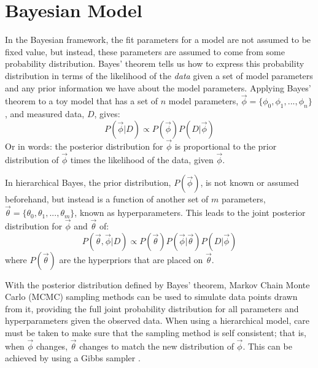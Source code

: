 \chapter{Bayesian Model} \label{ch:mcmc}

In the Bayesian framework, the fit parameters for a model are not assumed to be fixed value, but instead, these parameters are assumed to come from some probability distribution.  Bayes' theorem tells us how to express this probability distribution in terms of the likelihood of the {\em data} given a set of model parameters and any prior information we have about the model parameters.  Applying Bayes' theorem to a toy model that has a set of $n$ model parameters, $\vec{\phi} = \{\phi_0,\phi_1,...,\phi_n\}$, and measured data, $D$, gives:
\begin{equation}
 P(\vec{\phi}|D) \propto P(\vec{\phi})P(D|\vec{\phi})
\end{equation}
Or in words: the posterior distribution for $\vec{\phi}$ is proportional to the prior distribution of $\vec{\phi}$ times the likelihood of the data, given $\vec{\phi}$.

In hierarchical Bayes, the prior distribution, $P(\vec{\phi})$, is not known or assumed beforehand, but instead is a function of another set of $m$ parameters, $\vec{\theta} = \{\theta_0,\theta_1,...,\theta_m\}$, known as hyperparameters.  This leads to the joint posterior distribution for $\vec{\phi}$ and $\vec{\theta}$ of:
\begin{equation}
 P(\vec{\theta},\vec{\phi}|D) \propto P(\vec{\theta})P(\vec{\phi}|\vec{\theta})P(D|\vec{\phi})
\end{equation}
where $P(\vec{\theta})$ are the hyperpriors that are placed on $\vec{\theta}$.

With the posterior distribution defined by Bayes' theorem, Markov Chain Monte Carlo (MCMC) sampling methods can be used to simulate data points drawn from it, providing the full joint probability distribution for all parameters and hyperparameters given the observed data. When using a hierarchical model, care must be taken to make sure that the sampling method is self consistent; that is, when $\vec{\phi}$ changes, $\vec{\theta}$ changes to match the new distribution of $\vec{\phi}$.  This can be achieved by using a Gibbs sampler \citep{Gelman:2006}.

